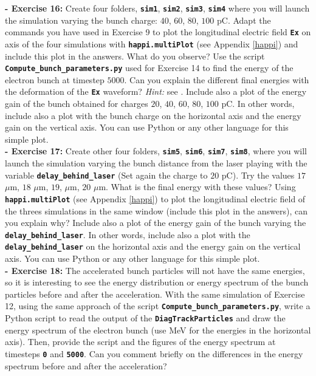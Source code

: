 \documentclass[a4paper,12pt]{extarticle}
\newcommand{\commandline}[1]{\texttt{\textbf{#1}}}
\begin{document}
\textbf{ - Exercise 16:} Create four folders, \commandline{sim1}, \commandline{sim2}, \commandline{sim3}, \commandline{sim4} where you will launch the simulation varying the bunch charge: $40$, $60$, $80$, $100$ pC. Adapt the commands you have used in Exercise 9 to plot the longitudinal electric field \commandline{Ex} on axis of the four simulations with \commandline{happi.multiPlot} (see Appendix \ref{happi}) and include this plot in the answers. What do you observe? Use the script \commandline{Compute\_bunch\_parameters.py} used for Exercise 14 to find the energy of the electron bunch at timestep $5000$. Can you explain the different final energies with the deformation of the \commandline{Ex} waveform? \textit{Hint:} see \cite{Rechatin2009,Rechatin2010}. Include also a plot of the energy gain of the bunch obtained for charges $20$, $40$, $60$, $80$, $100$ pC. In other words, include also a plot with the bunch charge on the horizontal axis and the energy gain on the vertical axis. You can use Python or any other language for this simple plot.\\

\textbf{ - Exercise 17:} Create other four folders, \commandline{sim5}, \commandline{sim6}, \commandline{sim7},  \commandline{sim8}, where you will launch the simulation varying the bunch distance from the laser playing with the variable \commandline{delay\_behind\_laser} (Set again the charge to $20$ pC). Try the values $17$ $\mu$m, $18$ $\mu$m, $19$, $\mu$m, $20$ $\mu$m. What is the final energy with these values? Using \commandline{happi.multiPlot} (see Appendix \ref{happi}) to plot the longitudinal electric field of the threes simulations in the same window (include this plot in the answers), can you explain why? Include also a plot of the energy gain of the bunch varying the \commandline{delay\_behind\_laser}. In other words, include also a plot with the \commandline{delay\_behind\_laser} on the horizontal axis and the energy gain on the vertical axis. You can use Python or any other language for this simple plot.\\

\textbf{- Exercise 18:} The accelerated bunch particles will not have the same energies, so it is interesting to see the energy distribution or energy spectrum of the bunch particles before and after the acceleration. With the same simulation of Exercise 12,  using the same approach of the script \commandline{Compute\_bunch\_parameters.py}, write a Python script to read the output of the \commandline{DiagTrackParticles} and draw the energy spectrum of the electron bunch (use MeV for the energies in the horizontal axis). Then, provide the script and the figures of the energy spectrum at timesteps \commandline{0} and \commandline{5000}.  Can you comment briefly on the differences in the energy spectrum before and after the acceleration?
\end{document}
